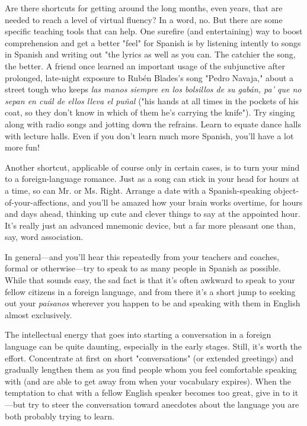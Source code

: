 Are there shortcuts for getting around the long months, even
years, that are needed to reach a level of virtual fluency? In a word, no.
But there are some specific teaching tools that can help. One surefire
(and entertaining) way to boost comprehension and get a better "feel"
for Spanish is by listening intently to songs in Spanish and writing out
"the lyrics as well as you can. The catchier the song, the better. A friend
once learned an important usage of the subjunctive after prolonged,
late-night exposure to Rubén Blades's song "Pedro Navaja," about a
street tough who keeps \emph{las manos siempre en los bolsillos de su gabán, pa' que no sepan en cuál de ellos lleva el puñal} ("his hands at all
times in the pockets of his coat, so they don't know in which of them
he's carrying the knife"). Try singing along with radio songs and jotting
down the refrains. Learn to equate dance halls with lecture halls. Even
if you don't learn much more Spanish, you'll have a lot more fun!

Another shortcut, applicable of course only in certain cases, is
to turn your mind to a foreign-language romance. Just as a song can
stick in your head for hours at a time, so can Mr. or Ms. Right. Arrange
a date with a Spanish-speaking object-of-your-affections, and you'll be
amazed how your brain works overtime, for hours and days ahead,
thinking up cute and clever things to say at the appointed hour. It's
really just an advanced mnemonic device, but a far more pleasant one
than, say, word association.

In general---and you'll hear this repeatedly from your teachers
and coaches, formal or otherwise---try to speak to as many people in
Spanish as possible. While that sounds easy, the sad fact is that it's often awkward to speak to your fellow citizens in a foreign language, and
from there it's a short jump to seeking out your \emph{paisanos} wherever you
happen to be and speaking with them in English almost exclusively.

The intellectual energy that goes into starting a conversation
in a foreign language can be quite daunting, especially in the early
stages. Still, it's worth the effort. Concentrate at first on short "conversations" (or extended greetings) and gradually lengthen them as you
find people whom you feel comfortable speaking with (and are able to
get away from when your vocabulary expires). When the temptation
to chat with a fellow English speaker becomes too great, give in to
it---but try to steer the conversation toward anecdotes about the language you are both probably trying to learn.

